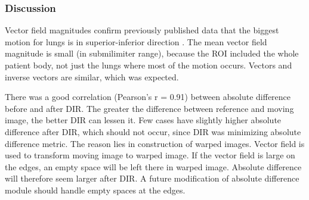 \documentclass[type=dr, dr=rernat, accentcolor=tud7b,colorbacktitle, bigchapter, openright, twoside, 12pt ]{tudthesis}
\begin{document}
\subsubsection{Discussion}

Vector field magnitudes confirm previously published data that the biggest motion for lungs is in superior-inferior direction \cite{Seppenwoolde2002, Britton2007, Liu2007}. The mean vector field magnitude is small (in submilimiter range), 
because the ROI included the whole patient body, not just the lungs where most of the motion occurs. Vectors and inverse vectors are similar, which was expected.

There was a good correlation (Pearson's r = 0.91) between absolute difference before and after DIR. The greater the difference between reference and moving image, the better DIR can lessen it. Few cases
have slightly higher absolute difference after DIR, which should not occur, since DIR was minimizing absolute difference metric. The reason lies in construction of warped images. Vector field is used to transform
moving image to warped image. If the vector field is large on the edges, an empty space will be left there in warped image. Absolute difference will therefore seem larger after DIR. A future modification of absolute difference
module should handle empty spaces at the edges.

\newpage
\end{document}
